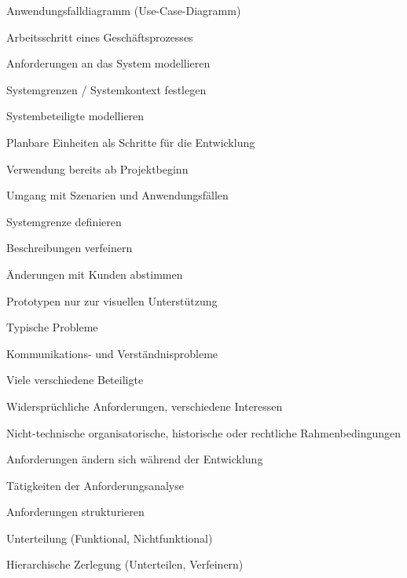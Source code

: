 \documentclass[a4paper]{article}
\begin{document}
\begin{multicols}{3}
\begin{itemize*}
\begin{itemize*}
\begin{description*}
      \end{description*}
      \item Anwendungsfalldiagramm (Use-Case-Diagramm)
      \begin{itemize*}
        \item Arbeitsschritt eines Geschäftsprozesses
        \item Anforderungen an das System modellieren
        \item Systemgrenzen / Systemkontext festlegen
        \item Systembeteiligte modellieren
        \item Planbare Einheiten als Schritte für die Entwicklung
        \item Verwendung bereits ab Projektbeginn
      \end{itemize*}
      \item Umgang mit Szenarien und Anwendungsfällen
      \begin{itemize*}
        \item Systemgrenze definieren
        \item Beschreibungen verfeinern
        \item Änderungen mit Kunden abstimmen
        \item Prototypen nur zur visuellen Unterstützung
      \end{itemize*}
    \end{itemize*}
    \item Typische Probleme
    \begin{itemize*}
      \item Kommunikations- und Verständnisprobleme
      \item Viele verschiedene Beteiligte
      \item Widersprüchliche Anforderungen, verschiedene Interessen
      \item Nicht-technische organisatorische, historische oder rechtliche Rahmenbedingungen
      \item Anforderungen ändern sich während der Entwicklung
    \end{itemize*}
    \item Tätigkeiten der Anforderungsanalyse
    \begin{itemize*}
      \item Anforderungen strukturieren
      \begin{itemize*}
        \item Unterteilung (Funktional, Nichtfunktional)
        \item Hierarchische Zerlegung (Unterteilen, Verfeinern)

\end{itemize*}
\end{itemize*}
\end{itemize*}
\end{multicols}
\end{document}
